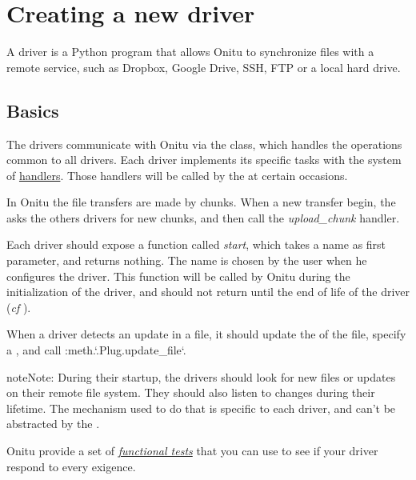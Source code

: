 \documentclass[letterpaper,10pt,english]{sphinxmanual}
\begin{document}
\section{Creating a new driver}
\label{drivers:creating-a-new-driver}\label{drivers::doc}
A driver is a Python program that allows Onitu to synchronize files with a remote service, such as Dropbox, Google Drive, SSH, FTP or a local hard drive.


\subsection{Basics}
\label{drivers:basics}
The drivers communicate with Onitu via the {\hyperref[drivers:onitu.api.Plug]{}} class, which handles the operations common to all drivers. Each driver implements its specific tasks with the system of {\hyperref[drivers:handlers]{handlers}}. Those handlers will be called by the {\hyperref[drivers:onitu.api.Plug]{}} at certain occasions.

In Onitu the file transfers are made by chunks. When a new transfer begin, the {\hyperref[drivers:onitu.api.Plug]{}} asks the others drivers for new chunks, and then call the \emph{upload\_chunk} handler.

Each driver should expose a function called \emph{start}, which takes a name as first parameter, and returns nothing. The name is chosen by the user when he configures the driver.
This function will be called by Onitu during the initialization of the driver, and should not return until the end of life of the driver (\emph{cf} {\hyperref[drivers:onitu.api.Plug.listen]{}}).

When a driver detects an update in a file, it should update the {\hyperref[drivers:onitu.api.metadata.Metadata]{}} of the file, specify a {\hyperref[drivers:onitu.api.metadata.Metadata.revision]{}}, and call :meth.{}`.Plug.update\_file{}`.

\begin{notice}{note}{Note:}
During their startup, the drivers should look for new files or updates on their remote file system. They should also listen to changes during their lifetime. The mechanism used to do that is specific to each driver, and can't be abstracted by the {\hyperref[drivers:onitu.api.Plug]{}}.
\end{notice}

Onitu provide a set of {\hyperref[contribute:tests]{\emph{functional tests}}} that you can use to see if your driver respond to every exigence.
\end{document}
